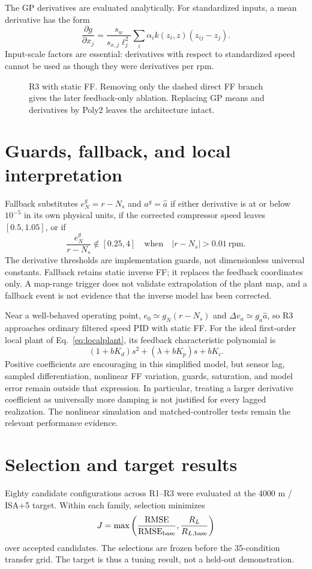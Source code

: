 \documentclass[11pt,a4paper,oneside]{report}
\newcommand{\RMSE}{\operatorname{RMSE}}
\newcommand{\blockfig}[3]{\begin{figure}[htbp]\centering\resizebox{.98\linewidth}{!}{#1}\caption{#2}\label{fig:#3}\end{figure}}
\begin{document}
The GP derivatives are evaluated analytically. For standardized inputs, a mean derivative has the form
\begin{equation}
\frac{\partial g}{\partial x_j}
=\frac{s_w}{s_{x,j}\ell_j^2}\sum_i\alpha_i k(z_i,z)(z_{ij}-z_j).
\end{equation}
Input-scale factors are essential: derivatives with respect to standardized speed cannot be used as though they were derivatives per rpm.

\blockfig{\diagramRthree}{R3 with static FF. Removing only the dashed direct FF branch gives the later feedback-only ablation. Replacing GP means and derivatives by Poly2 leaves the architecture intact.}{r3}

\section{Guards, fallback, and local interpretation}
Fallback substitutes $e_N^g=r-N_s$ and $a^g=\hat a$ if either derivative is at or below $10^{-5}$ in its own physical units, if the corrected compressor speed leaves $[0.5,1.05]$, or if
\begin{equation}
\frac{e_N^g}{r-N_s}\notin[0.25,4]\quad\text{when}\quad|r-N_s|>0.01\ \mathrm{rpm}.
\end{equation}
The derivative thresholds are implementation guards, not dimensionless universal constants. Fallback retains static inverse FF; it replaces the feedback coordinates only. A map-range trigger does not validate extrapolation of the plant map, and a fallback event is not evidence that the inverse model has been corrected.

Near a well-behaved operating point, $e_0\simeq g_N(r-N_s)$ and $\Delta v_a\simeq g_a\hat a$, so R3 approaches ordinary filtered speed PID with static FF. For the ideal first-order local plant of Eq.~\eqref{eq:localplant}, its feedback characteristic polynomial is
\begin{equation}
(1+bK_d)s^2+(\lambda+bK_p)s+bK_i.
\end{equation}
Positive coefficients are encouraging in this simplified model, but sensor lag, sampled differentiation, nonlinear FF variation, guards, saturation, and model error remain outside that expression. In particular, treating a larger derivative coefficient as universally more damping is not justified for every lagged realization. The nonlinear simulation and matched-controller tests remain the relevant performance evidence.

\section{Selection and target results}
Eighty candidate configurations across R1--R3 were evaluated at the 4000 m / ISA+5 target. Within each family, selection minimizes
\begin{equation}
J=\max\left(\frac{\RMSE}{\RMSE_{\rm base}},\frac{R_L}{R_{L,\rm base}}\right)
\end{equation}
over accepted candidates. The selections are frozen before the 35-condition transfer grid. The target is thus a tuning result, not a held-out demonstration.
\end{document}
